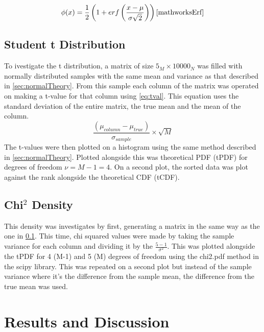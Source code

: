 \documentclass[a4paper, 12pt]{article}
\begin{document}
            \begin{equation}\label{eq:cdfNormal}
                \phi(x) = \frac{1}{2} \left( 1 + erf \left( \frac{x-\mu}{\sigma \sqrt{2}}\right) \right)  \cite{mathworksErf}
            \end{equation}
        \subsection{Student t Distribution} \label{sec:stTheory}
            To ivestigate the t distribution, a matrix of size $5_M \times 10000_N$ was filled with normally distributed samples with the same mean and variance as that described in \cref{sec:normalTheory}. From this sample each column of the matrix was operated on making a t-value for that column using \cref{eq:tval}. This equation uses the standard deviation of the entire matrix, the true mean and the mean of the column.
            \begin{equation}\label{eq:tval}
                \frac{\left(\mu_{column} - \mu_{true}\right)}{\sigma_{sample}} \times \sqrt{M}
            \end{equation}
            The t-values were then plotted on a histogram using the same method described in \cref{sec:normalTheory}. Plotted alongside this was theoretical PDF (tPDF) for degrees of freedom $\nu =M - 1 = 4$. On a second plot, the sorted data was plot against the rank alongside the theoretical CDF (tCDF).
        \subsection{Chi$^{2}$ Density}
            This density was investigates by first, generating a matrix in the same way as the one in \cref{sec:stTheory}. This time, chi squared values were made by taking the sample variance for each column and dividing it by the $\frac{5-1}{\sigma^2}$. This was plotted alongside the tPDF for 4 (M-1) and 5 (M) degrees of freedom using the chi2.pdf method in the scipy library. This was repeated on a second plot but instead of the sample variance where it's the difference from the sample mean, the difference from the true mean was used.
    \section{Results and Discussion}
\end{document}
